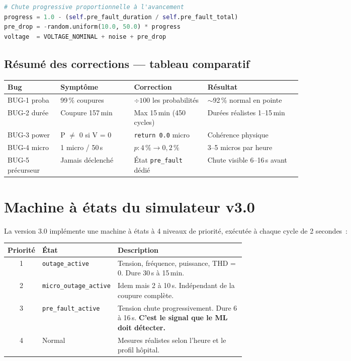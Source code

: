 \documentclass[12pt,a4paper]{article}
\begin{document}
\begin{lstlisting}[language=Python]
# Chute progressive proportionnelle à l'avancement
progress = 1.0 - (self.pre_fault_duration / self.pre_fault_total)
pre_drop = -random.uniform(10.0, 50.0) * progress
voltage  = VOLTAGE_NOMINAL + noise + pre_drop
\end{lstlisting}

\subsection{Résumé des corrections — tableau comparatif}

\begin{center}
\begin{tabularx}{\linewidth}{p{0.18\linewidth} p{0.25\linewidth}
                              p{0.25\linewidth} X}
\toprule
\textbf{Bug} & \textbf{Symptôme} & \textbf{Correction} &
\textbf{Résultat} \\
\midrule
BUG-1 proba &
  99\,\% coupures &
  $\div 100$ les probabilités &
  $\sim$92\,\% normal en pointe \\
BUG-2 durée &
  Coupure 157\,min &
  Max 15\,min (450 cycles) &
  Durées réalistes 1–15\,min \\
BUG-3 power &
  P $\neq$ 0 si V = 0 &
  \texttt{return 0.0} micro &
  Cohérence physique \\
BUG-4 micro &
  1 micro / 50\,s &
  $p : 4\,\% \to 0{,}2\,\%$ &
  3–5 micros par heure \\
BUG-5 précurseur &
  Jamais déclenché &
  État \texttt{pre\_fault} dédié &
  Chute visible 6–16\,s avant \\
\bottomrule
\end{tabularx}
\end{center}

\section{Machine à états du simulateur v3.0}

La version 3.0 implémente une machine à états à 4 niveaux de priorité,
exécutée à chaque cycle de 2 secondes~:

\begin{center}
\begin{tabular}{clp{0.55\linewidth}}
\toprule
\textbf{Priorité} & \textbf{État} & \textbf{Description} \\
\midrule
1 & \texttt{outage\_active}     &
  Tension, fréquence, puissance, THD = 0.
  Dure 30\,s à 15\,min. \\
2 & \texttt{micro\_outage\_active} &
  Idem mais 2 à 10\,s.
  Indépendant de la coupure complète. \\
3 & \texttt{pre\_fault\_active}  &
  Tension chute progressivement. Dure 6 à 16\,s.
  \textbf{C'est le signal que le ML doit détecter.} \\
4 & Normal                       &
  Mesures réalistes selon l'heure et le profil hôpital. \\
\bottomrule
\end{tabular}
\end{center}
\end{document}
